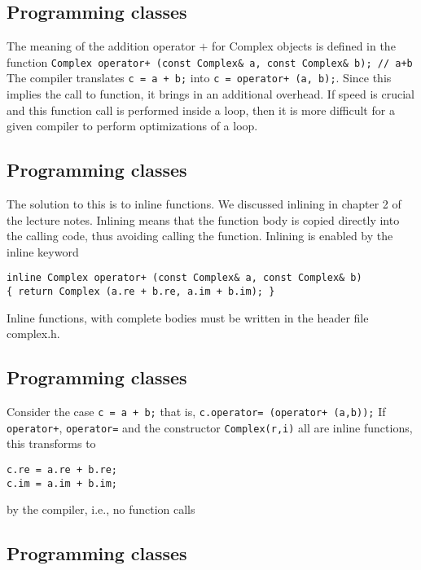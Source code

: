 \documentclass[%
oneside,                 %
final,                   %
10pt]{article}
\begin{document}
\subsection*{Programming classes}

The meaning of the addition operator $+$ for Complex objects is defined in the
function
\Verb!Complex operator+ (const Complex& a, const Complex& b); // a+b!
The compiler translates \Verb!c = a + b;! into \Verb!c = operator+ (a, b);!.
Since this implies the call to function, it brings in an additional overhead. If speed
is crucial and this function call is performed inside a loop, then it is more difficult for a
given compiler to perform optimizations of a loop.

\subsection*{Programming classes}

The solution to this is to inline functions.   We discussed inlining in chapter
2 of the lecture notes.
Inlining means that the function body is copied directly into
the calling code, thus avoiding calling the function.
Inlining is enabled by the inline keyword

\begin{verbatim}
inline Complex operator+ (const Complex& a, const Complex& b)
{ return Complex (a.re + b.re, a.im + b.im); }
\end{verbatim}
Inline functions, with complete bodies must be written in the header file  complex.h.

\subsection*{Programming classes}

Consider  the case \Verb!c = a + b;!
that is,  \Verb!c.operator= (operator+ (a,b));!
If \Verb!operator+!, \Verb!operator=! and the constructor \Verb!Complex(r,i)! all
are inline functions, this transforms to

\begin{verbatim}
c.re = a.re + b.re;
c.im = a.im + b.im;
\end{verbatim}
by the compiler, i.e., no function calls

\subsection*{Programming classes}
\end{document}
